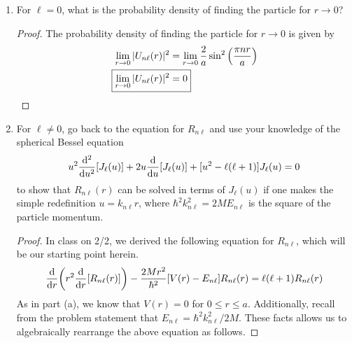 \documentclass[../psets.tex]{subfiles}
\begin{document}
\begin{enumerate}
\begin{enumerate}
\begin{proof}
            \begin{equation*}
                \boxed{U_{n\ell}(r) = \sqrt{\frac{2}{a}}\sin(\frac{\pi nr}{a})}
            \end{equation*}
            As noted in the problem statement, we can indeed see that that there are infinite possible solutions ($n=1,2,\dots$) for the value $\ell=0$.\footnote{Yunjia said in his 2/20 office hours that $\ell=0$ is the only value of $\ell$ we need to discuss in this part of this problem, despite the "for each value of $\ell$" wording in the problem statement.}
        \end{proof}
        \item For $\ell=0$, what is the probability density of finding the particle for $r\to 0$?
        \begin{proof}
            The probability density of finding the particle for $r\to 0$ is given by
            \begin{align*}
                \lim_{r\to 0}|U_{n\ell}(r)|^2 &= \lim_{r\to 0}\frac{2}{a}\sin^2\left( \frac{\pi nr}{a} \right)\\
                \Aboxed{\lim_{r\to 0}|U_{n\ell}(r)|^2 &= 0}
            \end{align*}
        \end{proof}
        \item For $\ell\neq 0$, go back to the equation for $R_{n\ell}$ and use your knowledge of the spherical Bessel equation
        \begin{equation}
            u^2\dv[2]{u}[J_\ell(u)]+2u\dv{u}[J_\ell(u)]+[u^2-\ell(\ell+1)]J_\ell(u) = 0
        \end{equation}
        to show that $R_{n\ell}(r)$ can be solved in terms of $J_\ell(u)$ if one makes the simple redefinition $u=k_{n\ell}r$, where $\hbar^2k_{n\ell}^2=2ME_{n\ell}$ is the square of the particle momentum.
        \begin{proof}
            In class on 2/2, we derived the following equation for $R_{n\ell}$, which will be our starting point herein.
            \begin{equation*}
                \dv{r}(r^2\dv{r}[R_{n\ell}(r)])-\frac{2Mr^2}{\hbar^2}[V(r)-E_{n\ell}]R_{n\ell}(r) = \ell(\ell+1)R_{n\ell}(r)
            \end{equation*}
            As in part (a), we know that $V(r)=0$ for $0\leq r\leq a$. Additionally, recall from the problem statement that $E_{n\ell}=\hbar^2k_{n\ell}^2/2M$. These facts allows us to algebraically rearrange the above equation as follows.

\end{proof}
\end{enumerate}
\end{enumerate}
\end{document}
